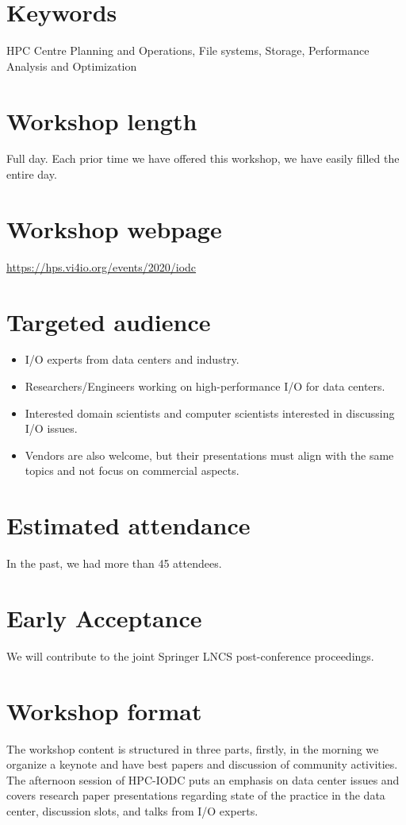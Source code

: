 \documentclass[a4paper,10pt]{article}
\begin{document}
\section{Keywords}
HPC Centre Planning and Operations, File systems, Storage, Performance Analysis and Optimization

\section{Workshop length}
Full day. Each prior time we have offered this workshop, we have easily filled the entire day.

\section{Workshop webpage}
\url{https://hps.vi4io.org/events/2020/iodc}


\section{Targeted audience}
\begin{itemize}
\item I/O experts from data centers and industry.
\item Researchers/Engineers working on high-performance I/O for data centers.
\item Interested domain scientists and computer scientists interested in discussing I/O issues.
\item Vendors are also welcome, but their presentations must align with the same topics and not focus on commercial aspects.
\end{itemize}




\section{Estimated attendance}
In the past, we had more than 45 attendees.

\section{Early Acceptance}

We will contribute to the joint Springer LNCS post-conference proceedings.

\section{Workshop format}
The workshop content is structured in three parts, firstly, in the morning we organize a keynote and have best papers and discussion of community activities.
The afternoon session of HPC-IODC puts an emphasis on data center issues and covers research paper presentations regarding state of the practice in the data center, discussion slots, and talks from I/O experts.
\end{document}
